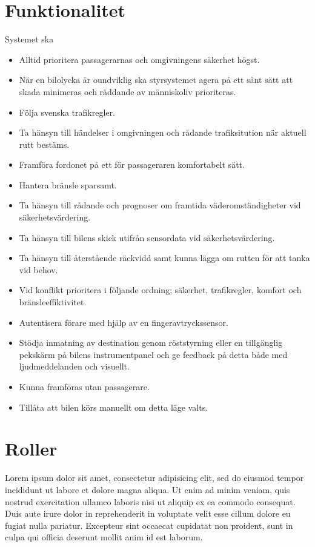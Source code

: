 \documentclass[10pt]{article}
\begin{document}
\section{Funktionalitet}
\sloppy
\noindent Systemet ska
\begin{itemize}
	\setlength\itemsep{0.1em}
	\item Alltid prioritera passagerarnas och omgivningens säkerhet högst.
	\item När en bilolycka är oundviklig ska styrsystemet agera på ett sånt sätt att skada minimeras och räddande av människoliv prioriteras.
	\item Följa svenska trafikregler.
	\item Ta hänsyn till händelser i omgivningen och rådande trafiksitution när aktuell rutt bestäms.
	\item Framföra fordonet på ett för passageraren komfortabelt sätt.
	\item Hantera bränsle sparsamt.
	\item Ta hänsyn till rådande och prognoser om framtida väderomständigheter vid säkerhetsvärdering.
	\item Ta hänsyn till bilens skick utifrån sensordata vid säkerhetsvärdering.
	\item Ta hänsyn till återstående räckvidd samt kunna lägga om rutten för att tanka vid behov.
	\item Vid konflikt prioritera i följande ordning; säkerhet, trafikregler, komfort och bränsleeffiktivitet.
	\item Autentisera förare med hjälp av en fingeravtryckssensor.
	\item Stödja inmatning av destination genom röststyrning eller en tillgänglig pekskärm på bilens instrumentpanel och ge feedback på detta både med ljudmeddelanden och visuellt.
	\item Kunna framföras utan passagerare.
	\item Tillåta att bilen körs manuellt om detta läge valts.
\end{itemize}


\section{Roller}
\sloppy
\noindent Lorem ipsum dolor sit amet, consectetur adipisicing elit, sed do eiusmod tempor incididunt ut labore et dolore magna aliqua. Ut enim ad minim veniam, quis nostrud exercitation ullamco laboris nisi ut aliquip ex ea commodo consequat. Duis aute irure dolor in reprehenderit in voluptate velit esse cillum dolore eu fugiat nulla pariatur. Excepteur sint occaecat cupidatat non proident, sunt in culpa qui officia deserunt mollit anim id est laborum.
\end{document}
